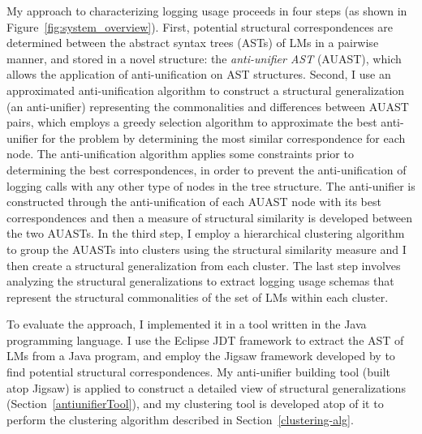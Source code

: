 My approach to characterizing logging usage proceeds in four steps (as shown in Figure~\ref{fig:system_overview}). First, potential structural correspondences are determined between the abstract syntax trees (ASTs) of LMs in a pairwise manner, and stored in a novel structure: the \emph{anti-unifier AST} (AUAST), which allows the application of anti-unification on AST structures. Second, I use an approximated anti-unification algorithm to construct a structural generalization (an anti-unifier) representing the commonalities and differences between AUAST pairs, which employs a greedy selection algorithm to approximate the best anti-unifier for the problem by determining the most similar correspondence for each node. The anti-unification algorithm applies some constraints prior to determining the best correspondences, in order to prevent the anti-unification of logging calls with any other type of nodes in the tree structure. The anti-unifier is constructed through the anti-unification of each AUAST node with its best correspondences and then a measure of structural similarity is developed between the two AUASTs. 
In the third step, I employ a hierarchical clustering algorithm to group the AUASTs into clusters using the structural similarity measure and I then create a structural generalization from each cluster. %
The last step involves analyzing the structural generalizations to extract logging usage schemas that represent the structural commonalities of the set of LMs within each cluster.

To evaluate the approach, I implemented it in a tool written in the Java programming language. I use the Eclipse JDT framework to extract the AST of LMs from a Java program, and employ the Jigsaw framework developed by \citet{2008:fse:cottrell} to find potential structural correspondences. My anti-unifier building tool (built atop Jigsaw) is applied to construct a detailed view of structural generalizations (Section~\ref{antiunifierTool}), and my clustering tool is developed atop of it to perform the clustering algorithm described in Section~\ref{clustering-alg}. 

